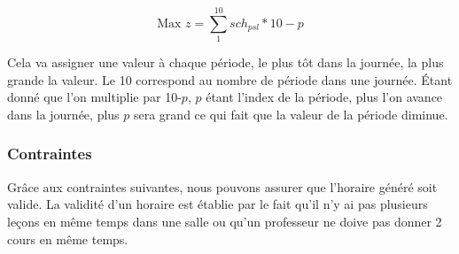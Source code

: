 \begin{equation*}
\text{Max } z = \sum_{1}^{10} sch_{psl} * 10-p
\end{equation*}

Cela va assigner une valeur à chaque période, le plus tôt dans la journée, la plus grande la valeur. Le 10 correspond au nombre de période dans une journée. Étant donné que l'on multiplie par 10-$p$, $p$ étant l'index de la période, plus l'on avance dans la journée, plus $p$ sera grand ce qui fait que la valeur de la période diminue.

\subsubsection{Contraintes}

Grâce aux contraintes suivantes, nous pouvons assurer que l'horaire généré soit valide. La validité d'un horaire est établie par le fait qu'il n'y ai pas plusieurs leçons en même temps dans une salle ou qu'un professeur ne doive pas donner 2 cours en même temps.

